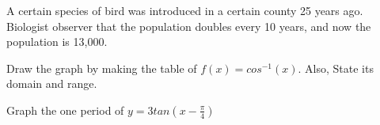 \documentclass[11pt]{exam}
\begin{document}
\begin{questions}

\newpage
\vspace{8cm}
\addpoints
\question[6] A certain species of bird was introduced in a certain county 25 years ago. Biologist observer that the population doubles every 10 years, and now the population is 13,000.   

\vspace{9cm}
\addpoints
\question[5] Draw the graph by making the table of  $f(x)=cos^{-1}(x)$. Also, State its domain and range.



\newpage
\addpoints
\question[5] Graph the one period of $y=3tan(x-\frac{\pi}{4})$








\end{questions}
\end{document}
